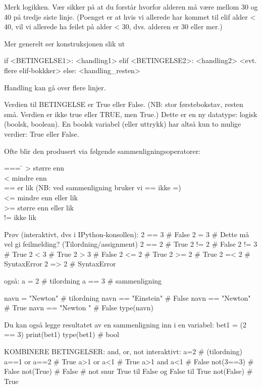 {Merk logikken. Vær sikker på at du forstår hvorfor alderen må være mellom 30 og 40 på tredje siste linje. (Poenget er at hvis vi allerede har kommet til elif alder < 40, vil vi allerede ha feilet på alder < 30, dvs. alderen er 30 eller mer.) 

Mer generelt ser konstruksjonen slik ut

\begin{usncodebox}
if <BETINGELSE1>: 
   <handling1>
elif <BETINGELSE2>: 
   <handling2>
<evt. flere elif-bokkker>
else: 
   <handling_resten>
\end{usncodebox}

Handling kan gå over flere linjer. 

Verdien til BETINGELSE er True eller False. (NB: stor førstebokstav, resten små. Verdien er ikke true eller TRUE, men True.) Dette er en ny datatype: logisk (boolsk, boolean). En boolsk variabel (eller uttrykk) har altså kun to mulige verdier: True eller False. 

Ofte blir den produsert via følgende sammenligningsoperatorer:
\begin{tabbing}
=== \=\kill
>  \> større enn\\
<  \> mindre enn\\
== \> er lik  (NB: ved sammenligning bruker vi == ikke =)\\
<= \> mindre enn eller lik\\
>= \> større enn eller lik\\
!= \> ikke lik
\end{tabbing}

\iffalse

Prøv (interaktivt, dvs i IPython-konsollen): 
2 == 3   # False
2 = 3    # Dette må vel gi feilmelding? (Tilordning/assignment)
2 == 2   # True
2 != 2   # False
2 != 3   # True
2 < 3    # True
2 > 3    # False
2 <= 2   # True
2 >= 2   # True
2 =< 2   # SyntaxError
2 => 2   # SyntaxError

også:
a = 2    # tilordning
a == 3   # sammenligning

navn = "Newton"       # tilordning
navn == "Einstein"    # False 
navn == "Newton"      # True
navn == "Newton "     # False
type(navn)

Du kan også legge resultatet av en sammenligning inn i en variabel:
bet1 = (2 == 3)   
print(bet1)
type(bet1)   # bool


KOMBINERE BETINGELSER: and, or, not 
interaktivt: 
a=2             # (tilordning)
a==1 or a==2    # True 
a>1  or  a<1    # True 
a>1  and a<1    # False
not(3==3)       # False
not(True)       # False  # not snur True til False og False til True
not(False)      # True 



}
